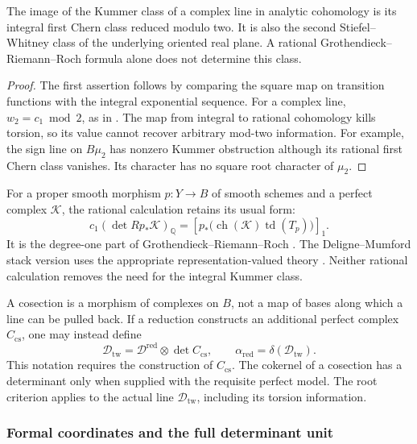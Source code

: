 \begin{proposition}
\label{prop:rhomred-w2-formula}
The image of the Kummer class of a complex line in analytic cohomology
is its integral first Chern class reduced modulo two.  It is also the
second Stiefel--Whitney class of the underlying oriented real plane.
A rational Grothendieck--Riemann--Roch formula alone does not determine
this class.
\end{proposition}
\begin{proof}
The first assertion follows by comparing the square map on transition
functions with the integral exponential sequence.  For a complex line,
\(w_2=c_1\bmod2\), as in \cite{MilnorStasheffCharacteristicClasses}.
The map from integral to rational cohomology kills torsion, so its value
cannot recover arbitrary mod-two information.  For example, the sign
line on \(B\mu_2\) has nonzero Kummer obstruction although its rational
first Chern class vanishes.  Its character has no square root character
of \(\mu_2\).
\end{proof}

For a proper smooth morphism \(p:Y\to B\) of smooth schemes and a
perfect complex \(\mathcal K\), the rational calculation retains its
usual form:
\[
 c_1(\det Rp_*\mathcal K)_{\mathbb Q}
 =\left[p_*\bigl(\operatorname{ch}(\mathcal K)
             \operatorname{td}(T_p)\bigr)\right]_1.
\]
It is the degree-one part of Grothendieck--Riemann--Roch
\cite[Tag 02UO]{StacksProject}.  The Deligne--Mumford stack version
uses the appropriate representation-valued theory
\cite{ToenRRRoot}.  Neither rational calculation removes the need
for the integral Kummer class.

A cosection is a morphism of complexes on \(B\), not a map of bases
along which a line can be pulled back.  If a reduction constructs an
additional perfect complex \(C_{\mathrm{cs}}\), one may instead define
\[
 \mathscr D_{\mathrm{tw}}
 =\mathscr D^{\mathrm{red}}\otimes\det C_{\mathrm{cs}},\qquad
 \alpha_{\mathrm{red}}=\delta(\mathscr D_{\mathrm{tw}}).
\]
This notation requires the construction of \(C_{\mathrm{cs}}\).
The cokernel of a cosection has a determinant only when supplied with
the requisite perfect model.  The root criterion applies to the actual
line \(\mathscr D_{\mathrm{tw}}\), including its torsion information.

\subsubsection*{Formal coordinates and the full determinant unit}

